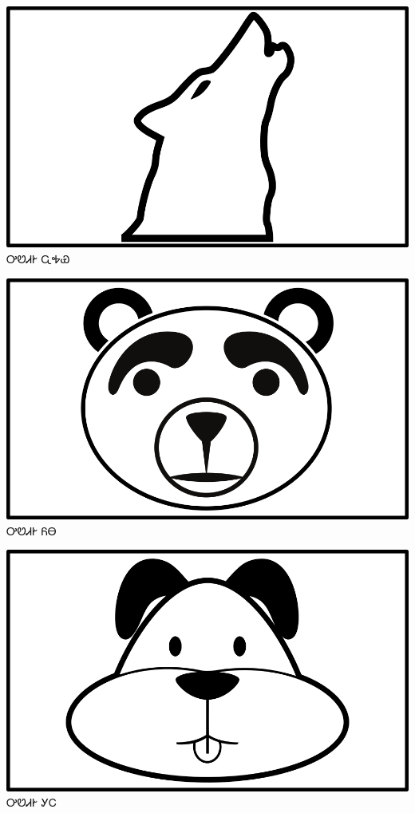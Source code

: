 \documentclass[avery5371]{flashcards}%
\begin{document}
\begin{flashcard}{
\includegraphics[width=0.95\columnwidth,height=.51\columnwidth,keepaspectratio]{../artwork/objects-animate/wahya}
}\Huge ᎤᏬᏗᎨ ᏩᎭᏯ
\end{flashcard}

\begin{flashcard}{
\includegraphics[width=0.95\columnwidth,height=.51\columnwidth,keepaspectratio]{../artwork/objects-animate/yona}
}\Huge ᎤᏬᏗᎨ ᏲᎾ
\end{flashcard}

\begin{flashcard}{
\includegraphics[width=0.95\columnwidth,height=.51\columnwidth,keepaspectratio]{../artwork/objects-animate/gihli}
}\Huge ᎤᏬᏗᎨ ᎩᏟ
\end{flashcard}
\end{document}
